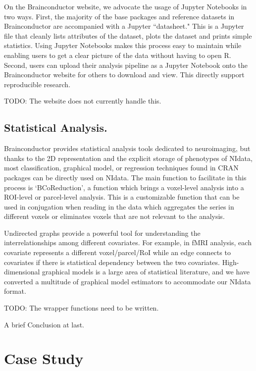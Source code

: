 \documentclass{nature}
\begin{document}
On the Brainconductor website, we advocate the usage of Jupyter Notebooks
in two ways. First, the majority of the base packages and reference datasets
in Brainconductor are accompanied with a Jupyter ``datasheet." This is a
Jupyter file that cleanly lists attributes of the dataset, plots the dataset
and prints simple statistics. Using Jupyter Notebooks makes this process easy
to maintain while enabling users to get a clear picture of the data without
having to open R. Second, users can upload their analysis pipeline as a Jupyter
Notebook onto the Brainconductor website for others to download and view. This
directly support reproducible research.

{\color{red}TODO: The website does not currently handle this.}

\subsection{Statistical Analysis.}

Brainconductor provides statistical analysis tools dedicated to neuroimaging,
but thanks to the 2D representation and the explicit storage of
phenotypes of NIdata, most classification, graphical model, or regression
techniques
found in CRAN packages can be directly used on NIdata. The main function to
facilitate in this process is `BCoReduction', a function which brings a
voxel-level
analysis into a ROI-level or parcel-level analysis. This is a customizable
function
that can be used in conjugation when reading in the data which aggregates
the series
in different voxels or eliminates voxels that are not relevant to the analysis.

Undirected graphs provide a powerful tool for understanding the interrelationships among
different covariates. For example, in fMRI analysis, each covariate represents 
a different voxel/parcel/RoI while an edge connects to covariates if there is
statistical dependency between the two covariates. High-dimensional graphical
models is a large area of statistical literature, and we have converted 
a multitude of graphical model estimators to accommodate our NIdata format.


{\color{red}TODO: The wrapper functions need to be written.}

A brief Conclusion at last.

\section{Case Study}
\end{document}

